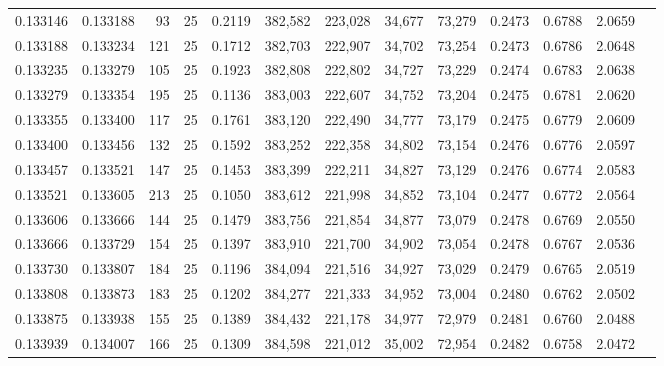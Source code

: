 \begin{tabular}{rrrrrrrrrrrrr}
0.133146 & 0.133188 &    93 &  25 &                                     0.2119 & 382,582 & 223,028 &  34,677 &  73,279 & 0.2473 & 0.6788 & 2.0659 \\
0.133188 & 0.133234 &   121 &  25 &                                     0.1712 & 382,703 & 222,907 &  34,702 &  73,254 & 0.2473 & 0.6786 & 2.0648 \\
0.133235 & 0.133279 &   105 &  25 &                                     0.1923 & 382,808 & 222,802 &  34,727 &  73,229 & 0.2474 & 0.6783 & 2.0638 \\
0.133279 & 0.133354 &   195 &  25 &                                     0.1136 & 383,003 & 222,607 &  34,752 &  73,204 & 0.2475 & 0.6781 & 2.0620 \\
0.133355 & 0.133400 &   117 &  25 &                                     0.1761 & 383,120 & 222,490 &  34,777 &  73,179 & 0.2475 & 0.6779 & 2.0609 \\
0.133400 & 0.133456 &   132 &  25 &                                     0.1592 & 383,252 & 222,358 &  34,802 &  73,154 & 0.2476 & 0.6776 & 2.0597 \\
0.133457 & 0.133521 &   147 &  25 &                                     0.1453 & 383,399 & 222,211 &  34,827 &  73,129 & 0.2476 & 0.6774 & 2.0583 \\
0.133521 & 0.133605 &   213 &  25 &                                     0.1050 & 383,612 & 221,998 &  34,852 &  73,104 & 0.2477 & 0.6772 & 2.0564 \\
0.133606 & 0.133666 &   144 &  25 &                                     0.1479 & 383,756 & 221,854 &  34,877 &  73,079 & 0.2478 & 0.6769 & 2.0550 \\
0.133666 & 0.133729 &   154 &  25 &                                     0.1397 & 383,910 & 221,700 &  34,902 &  73,054 & 0.2478 & 0.6767 & 2.0536 \\
0.133730 & 0.133807 &   184 &  25 &                                     0.1196 & 384,094 & 221,516 &  34,927 &  73,029 & 0.2479 & 0.6765 & 2.0519 \\
0.133808 & 0.133873 &   183 &  25 &                                     0.1202 & 384,277 & 221,333 &  34,952 &  73,004 & 0.2480 & 0.6762 & 2.0502 \\
0.133875 & 0.133938 &   155 &  25 &                                     0.1389 & 384,432 & 221,178 &  34,977 &  72,979 & 0.2481 & 0.6760 & 2.0488 \\
0.133939 & 0.134007 &   166 &  25 &                                     0.1309 & 384,598 & 221,012 &  35,002 &  72,954 & 0.2482 & 0.6758 & 2.0472 \\

\end{tabular}
